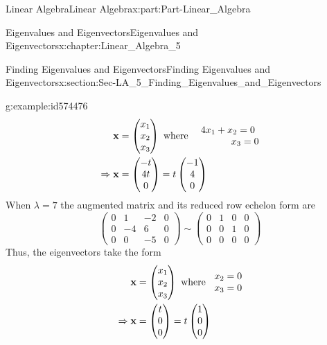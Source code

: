 \documentclass[oneside,10pt,]{book}
\numberwithin{equation}{section}
\newcommand{\amp}{&}
\begin{document}
\begin{partptx}{Linear Algebra}{}{Linear Algebra}{}{}{x:part:Part-Linear_Algebra}
\begin{chapterptx}{Eigenvalues and Eigenvectors}{}{Eigenvalues and Eigenvectors}{}{}{x:chapter:Linear_Algebra_5}
\begin{sectionptx}{Finding Eigenvalues and Eigenvectors}{}{Finding Eigenvalues and Eigenvectors}{}{}{x:section:Sec-LA_5_Finding_Eigenvalues_and_Eigenvectors}
\begin{example}{}{g:example:id574476}
\begin{align*}
\mathbf{x} \amp =\begin{pmatrix} x_1 \\ x_2 \\ x_3 \end{pmatrix} \textrm{ where } \begin{matrix} \hspace{2mm} 4x_1+x_2=0 \\ \hspace{14.5mm} x_3=0 \end{matrix} \\
\Rightarrow \mathbf{x} \amp =\begin{pmatrix} -t \\ 4t \\ 0 \end{pmatrix} = t\begin{pmatrix} -1 \\ 4 \\ 0 \end{pmatrix}
\end{align*}
When \(\lambda=7\) the augmented matrix and its reduced row echelon form are%
\begin{equation*}
\begin{pmatrix} 0 \amp 1 \amp -2 \amp 0 \\ 0 \amp -4 \amp 6 \amp 0 \\ 0 \amp 0 \amp -5 \amp 0 \end{pmatrix} \sim \begin{pmatrix} 0 \amp 1 \amp 0 \amp 0 \\ 0 \amp 0 \amp 1 \amp 0 \\ 0 \amp 0 \amp 0 \amp 0 \end{pmatrix} 
\end{equation*}
Thus, the eigenvectors take the form%
\begin{align*}
\mathbf{x} \amp =\begin{pmatrix} x_1 \\ x_2 \\ x_3 \end{pmatrix} \textrm{ where } \begin{matrix} \hspace{2mm} x_2=0 \\ \hspace{2mm} x_3=0 \end{matrix} \\
\Rightarrow \mathbf{x} \amp =\begin{pmatrix} t \\ 0 \\ 0 \end{pmatrix} = t\begin{pmatrix} 1 \\ 0 \\ 0 \end{pmatrix}

\end{align*}
\end{example}
\end{sectionptx}
\end{chapterptx}
\end{partptx}
\end{document}
